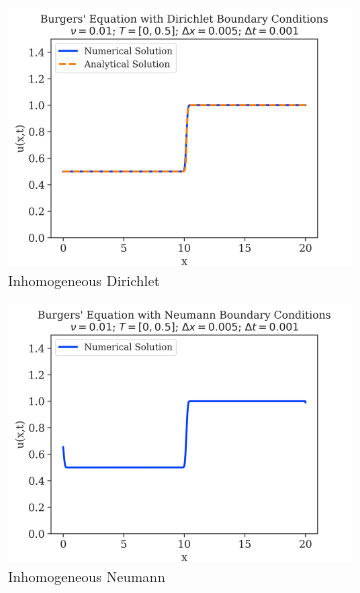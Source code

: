 \begin{figure}
	\centering
	\begin{subfigure}{0.55\linewidth}
		\centering
		\includegraphics[width=\linewidth]{../dirichlet_BC/images_nu=0.01/250_plot}
		\caption{Inhomogeneous Dirichlet}
	\end{subfigure}
	\hfill
	\begin{subfigure}{0.55\linewidth}
		\centering
		\includegraphics[width=\linewidth]{../neumann_BC/images_nu=0.01/250_plot}
		\caption{Inhomogeneous Neumann}
	\end{subfigure}
	\hfill
	\begin{subfigure}{0.55\linewidth}
		\centering

\end{subfigure}
\end{figure}
